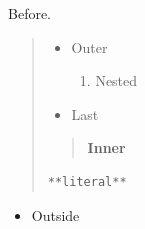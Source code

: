 \begin{frame}[t,fragile]
Before.

\begin{quote}
\begin{itemize}
\item Outer
\begin{enumerate}
\item Nested
\end{enumerate}
\item Last
\end{itemize}

\begin{quote}
\textbf{Inner}
\end{quote}

\begin{verbatim}
**literal**
\end{verbatim}
\end{quote}

\begin{itemize}
\item Outside
\end{itemize}
\end{frame}

